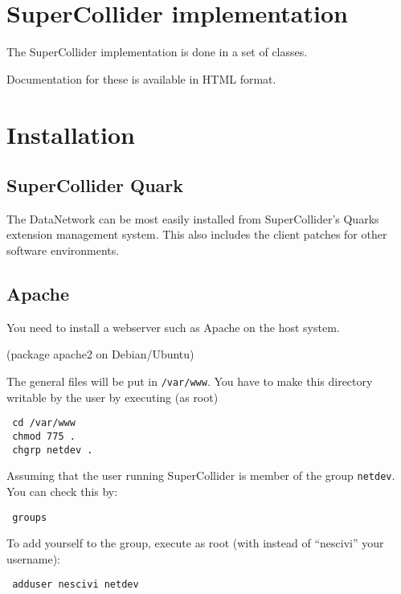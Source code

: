 \documentclass[letterpaper,10pt]{article}
\begin{document}
\section{SuperCollider implementation}

The SuperCollider implementation is done in a set of classes.

Documentation for these is available in HTML format.


\section{Installation}

\subsection{SuperCollider Quark}

The DataNetwork can be most easily installed from SuperCollider's Quarks extension management system.
This also includes the client patches for other software environments.

\subsection{Apache}

You need to install a webserver such as Apache on the host system.

(package apache2 on Debian/Ubuntu)

The general files will be put in \verb|/var/www|.
You have to make this directory writable by the user by executing (as root)

\begin{verbatim}
 cd /var/www
 chmod 775 .
 chgrp netdev .
\end{verbatim}

Assuming that the user running SuperCollider is member of the group \verb|netdev|. You can check this by:

\begin{verbatim}
 groups
\end{verbatim}

To add yourself to the group, execute as root (with instead of ``nescivi'' your username):
\begin{verbatim}
 adduser nescivi netdev
\end{verbatim}

\end{document}
